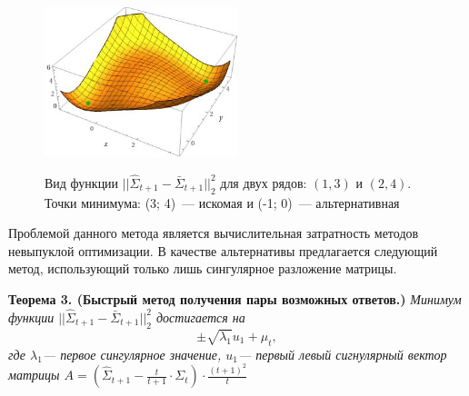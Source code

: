 \documentclass{article}
\begin{document}
\begin{figure}[H]
	\centering
	\begin{center}
		\includegraphics[width=0.5\textwidth]{CorrelationError}
		\label{fig:fig5}
	\end{center}
	\caption{Вид функции $||\hat{\Sigma}_{t+1} - \bar{\Sigma}_{t+1}||_2^2$ для двух рядов: $(1, 3)$ и $(2, 4)$. Точки минимума: (3; 4)~--- искомая и (-1; 0)~--- альтернативная}
\end{figure}


Проблемой данного метода является вычислительная затратность методов невыпуклой оптимизации. В качестве альтернативы предлагается следующий метод, использующий только лишь сингулярное разложение матрицы.

\textbf{Теорема 3. (Быстрый метод получения пары возможных ответов.)} \textit{Минимум функции $||\hat{\Sigma}_{t+1} - \bar{\Sigma}_{t+1}||_2^2$ достигается на \[\pm\sqrt{\lambda_1} u_1 + \mu_t,\] где $\lambda_1$--- первое сингулярное значение, $u_1$--- первый левый сигнулярный вектор матрицы $A=\left(\hat{\Sigma}_{t+1} - \frac{t}{t+1} \cdot \Sigma_t \right) \cdot \frac{(t+1)^2}{t}$}
\end{document}
